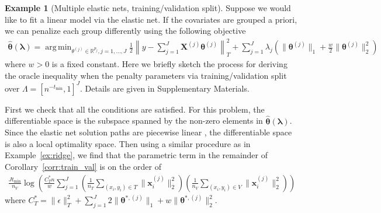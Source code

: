 \documentclass[12pt]{article} %
\theoremstyle{definition}
\newtheorem{example}{Example}
\DeclareMathOperator*{\argmin}{arg\,min}
\begin{document}
\begin{example}[Multiple elastic nets, training/validation split]
	\label{ex:elastic_net_tv}
	Suppose we would like to fit a linear model via the elastic net.
	If the covariates are grouped a priori, we can penalize each group differently using the following objective
	\begin{align}
	\hat{\boldsymbol{\theta}}(\boldsymbol{\lambda})
	=\argmin_{\theta^{(j)} \in \mathbb{R}^{p_j}, j = 1,...,J}
	\frac{1}{2} \left \| y - \sum_{j=1}^J \boldsymbol{X}^{(j)} \boldsymbol{\theta}^{(j)} \right \|_T^2
	+ \sum_{j=1}^J \lambda_j \left(
	\| \boldsymbol{\theta}^{(j)}\|_1
	+ \frac{w}{2} \| \boldsymbol{\theta}^{(j)}\|_2^2
	\right)
	\label{eq:elastic_net_ex}
	\end{align}
	where $w > 0$ is a fixed constant.
	Here we briefly sketch the process for deriving the oracle inequality when the penalty parameters via training/validation split over $\Lambda = [n^{-t_{\min}}, 1]^J$.
	Details are given in Supplementary Materials.

	First we check that all the conditions are satisfied.
	For this problem, the differentiable space is the subspace spanned by the non-zero elements in $\hat{\boldsymbol{\theta}}(\boldsymbol{\lambda})$.
	Since the elastic net solution paths are piecewise linear \citep{zou2003regression}, the differentiable space is also a local optimality space.
	Then using a similar procedure as in Example~\ref{ex:ridge}, we find that the parametric term in the remainder of Corollary~\ref{corr:train_val} is on the order of
	\begin{align}
	\frac{J t_{\min}}{n_{V}}
	\log \left (
	\frac{C^*_T n}{w}
	\sum_{j=1}^J
	\left(\frac{1}{n_T} \sum_{(x_i, y_i) \in T} \|\boldsymbol{x}_i^{(j)}\|^2_2\right)
	\left(\frac{1}{n_V} \sum_{(x_i, y_i) \in V} \|\boldsymbol{x}_i^{(j)}\|^2_2\right)
	\right )
	\end{align}
	where
	$
	C^*_T =
	\|\epsilon\|_{T}^{2}
	+\sum_{j=1}^J
	2 \|\boldsymbol{\theta}^{*,(j)}\|_1
	+ w\|\boldsymbol{\theta}^{*,(j)}\|_2^2
	$.
\end{example}
\end{document}
